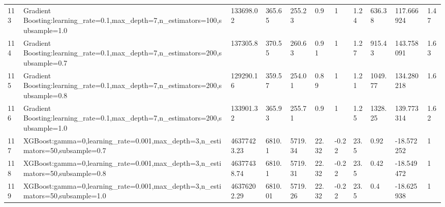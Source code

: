 \begin{longtable}{C{0.8cm} L{2cm} C{1.15cm} C{1.15cm} C{1.15cm} C{1.15cm} C{0.85cm} C{1.25cm} C{1.2cm} C{1.5cm} C{1.0cm}}
113 & Gradient Boosting:\newline learning\_rate=0.1,\newline max\_depth=7,\newline n\_estimators=100,\newline subsample=1.0 & 133698.02 & 365.65 & 255.23 & 0.9 & 1 & 1.24 & 636.38 & 117.666924 & 1.47 \\
114 & Gradient Boosting:\newline learning\_rate=0.1,\newline max\_depth=7,\newline n\_estimators=200,\newline subsample=0.7 & 137305.8 & 370.55 & 260.63 & 0.91 & 1 & 1.27 & 915.43 & 143.758091 & 1.63 \\
115 & Gradient Boosting:\newline learning\_rate=0.1,\newline max\_depth=7,\newline n\_estimators=200,\newline subsample=0.8 & 129290.16 & 359.57 & 254.01 & 0.89 & 1 & 1.21 & 1049.77 & 134.280218 & 1.6 \\
116 & Gradient Boosting:\newline learning\_rate=0.1,\newline max\_depth=7,\newline n\_estimators=200,\newline subsample=1.0 & 133901.32 & 365.93 & 255.71 & 0.9 & 1 & 1.25 & 1328.25 & 139.773314 & 1.62 \\
117 & XGBoost:\newline gamma=0,\newline learning\_rate=0.001,\newline max\_depth=3,\newline n\_estimators=50,\newline subsample=0.7 & 46377423.23 & 6810.1 & 5719.34 & 22.32 & -0.22 & 23.5 & 0.92 & -18.572252 & 1 \\
118 & XGBoost:\newline gamma=0,\newline learning\_rate=0.001,\newline max\_depth=3,\newline n\_estimators=50,\newline subsample=0.8 & 46377438.74 & 6810.1 & 5719.31 & 22.32 & -0.22 & 23.5 & 0.42 & -18.549472 & 1 \\
119 & XGBoost:\newline gamma=0,\newline learning\_rate=0.001,\newline max\_depth=3,\newline n\_estimators=50,\newline subsample=1.0 & 46376202.29 & 6810.01 & 5719.26 & 22.32 & -0.22 & 23.5 & 0.4 & -18.625938 & 1 \\

\end{longtable}
